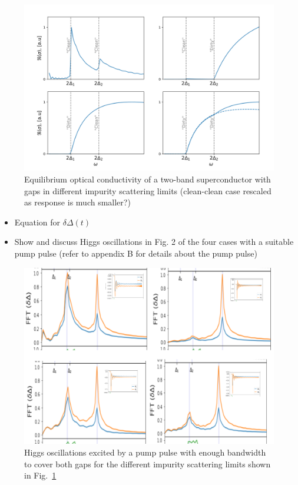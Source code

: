 \documentclass[aps,prb,reprint,noeprint,superscriptaddress]{revtex4-2}
\begin{document}
\begin{figure}[H]
    \centering
    \includegraphics[width=\columnwidth]{figures/two_band_cond.png}
    \caption{\label{fig:two_band_cond}%
    Equilibrium optical conductivity of a two-band superconductor with gaps in different impurity scattering limits (clean-clean case rescaled as response is much smaller?)}
\end{figure}%

\begin{itemize}
	\item Equation for $\delta\Delta(t)$
	\item Show and discuss Higgs oscillations in Fig. 2 of the four cases with a suitable pump pulse (refer to appendix B for details about the pump pulse)
\end{itemize}

\begin{figure}[H]
    \centering
    \includegraphics[width=\columnwidth]{figures/gap_osci.png}
    \caption{\label{fig:gap_osci}%
    Higgs oscillations excited by a pump pulse with enough bandwidth to cover both gaps for the different impurity scattering limits shown in Fig.~\ref{fig:two_band_cond}}
\end{figure}%
\end{document}

